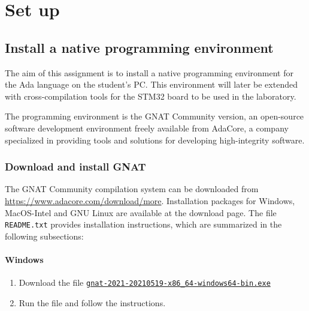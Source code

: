 \chapter{Set up}\label{ch:Setup}


\section{Install a native programming environment}

The aim of this assignment is to
install a native programming environment
for the Ada language on the student's PC.
This environment will later be extended with cross-compilation tools
for the STM32 board to be used in the laboratory.

The programming environment is the GNAT Community version,
an open-source software development environment freely available from AdaCore,
a company specialized in providing tools
and solutions for developing high-integrity software.


\subsection{Download and install GNAT}
The GNAT Community compilation system can be downloaded from \url{https://www.adacore.com/download/more}.
Installation packages for Windows, MacOS-Intel and GNU Linux
are available at the download page.
The file \texttt{README.txt} provides installation instructions,
which are summarized in the following subsections:

\subsubsection*{Windows}
\begin{enumerate}
\item Download the file \href{https://community.download.adacore.com/v1/797dbae8bdb8a3f661dad78dd73d8e40218a68d8?filename=gnat-2021-20210519-x86\_64-windows64-bin.exe\&rand=1472}{\texttt{gnat-2021-20210519-x86\_64-windows64-bin.exe}}

\item Run the file and follow the instructions.
\end{enumerate}

